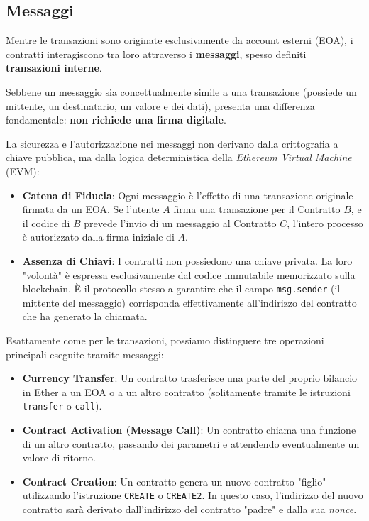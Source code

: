 \subsection{Messaggi}

Mentre le transazioni sono originate esclusivamente da account esterni (EOA), i contratti interagiscono tra loro attraverso i \textbf{messaggi}, spesso definiti \textbf{transazioni interne}. 

Sebbene un messaggio sia concettualmente simile a una transazione (possiede un mittente, un destinatario, un valore e dei dati), presenta una differenza fondamentale: \textbf{non richiede una firma digitale}.

La sicurezza e l'autorizzazione nei messaggi non derivano dalla crittografia a chiave pubblica, ma dalla logica deterministica della \textit{Ethereum Virtual Machine} (EVM):
\begin{itemize}
    \item \textbf{Catena di Fiducia}: Ogni messaggio è l'effetto di una transazione originale firmata da un EOA. Se l'utente $A$ firma una transazione per il Contratto $B$, e il codice di $B$ prevede l'invio di un messaggio al Contratto $C$, l'intero processo è autorizzato dalla firma iniziale di $A$.
    \item \textbf{Assenza di Chiavi}: I contratti non possiedono una chiave privata. La loro "volontà" è espressa esclusivamente dal codice immutabile memorizzato sulla blockchain. È il protocollo stesso a garantire che il campo \texttt{msg.sender} (il mittente del messaggio) corrisponda effettivamente all'indirizzo del contratto che ha generato la chiamata.
\end{itemize}

Esattamente come per le transazioni, possiamo distinguere tre operazioni principali eseguite tramite messaggi:
\begin{itemize}
    \item \textbf{Currency Transfer}: Un contratto trasferisce una parte del proprio bilancio in Ether a un EOA o a un altro contratto (solitamente tramite le istruzioni \texttt{transfer} o \texttt{call}).
    \item \textbf{Contract Activation (Message Call)}: Un contratto chiama una funzione di un altro contratto, passando dei parametri e attendendo eventualmente un valore di ritorno.
    \item \textbf{Contract Creation}: Un contratto genera un nuovo contratto "figlio" utilizzando l'istruzione \texttt{CREATE} o \texttt{CREATE2}. In questo caso, l'indirizzo del nuovo contratto sarà derivato dall'indirizzo del contratto "padre" e dalla sua \textit{nonce}.
\end{itemize}
